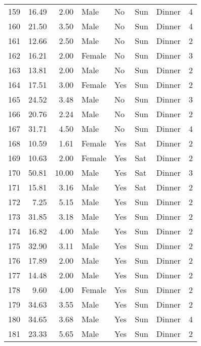 \begin{tabular}{lrrllllr}
159 &       16.49 &   2.00 &    Male &     No &   Sun &  Dinner &     4 \\
160 &       21.50 &   3.50 &    Male &     No &   Sun &  Dinner &     4 \\
161 &       12.66 &   2.50 &    Male &     No &   Sun &  Dinner &     2 \\
162 &       16.21 &   2.00 &  Female &     No &   Sun &  Dinner &     3 \\
163 &       13.81 &   2.00 &    Male &     No &   Sun &  Dinner &     2 \\
164 &       17.51 &   3.00 &  Female &    Yes &   Sun &  Dinner &     2 \\
165 &       24.52 &   3.48 &    Male &     No &   Sun &  Dinner &     3 \\
166 &       20.76 &   2.24 &    Male &     No &   Sun &  Dinner &     2 \\
167 &       31.71 &   4.50 &    Male &     No &   Sun &  Dinner &     4 \\
168 &       10.59 &   1.61 &  Female &    Yes &   Sat &  Dinner &     2 \\
169 &       10.63 &   2.00 &  Female &    Yes &   Sat &  Dinner &     2 \\
170 &       50.81 &  10.00 &    Male &    Yes &   Sat &  Dinner &     3 \\
171 &       15.81 &   3.16 &    Male &    Yes &   Sat &  Dinner &     2 \\
172 &        7.25 &   5.15 &    Male &    Yes &   Sun &  Dinner &     2 \\
173 &       31.85 &   3.18 &    Male &    Yes &   Sun &  Dinner &     2 \\
174 &       16.82 &   4.00 &    Male &    Yes &   Sun &  Dinner &     2 \\
175 &       32.90 &   3.11 &    Male &    Yes &   Sun &  Dinner &     2 \\
176 &       17.89 &   2.00 &    Male &    Yes &   Sun &  Dinner &     2 \\
177 &       14.48 &   2.00 &    Male &    Yes &   Sun &  Dinner &     2 \\
178 &        9.60 &   4.00 &  Female &    Yes &   Sun &  Dinner &     2 \\
179 &       34.63 &   3.55 &    Male &    Yes &   Sun &  Dinner &     2 \\
180 &       34.65 &   3.68 &    Male &    Yes &   Sun &  Dinner &     4 \\
181 &       23.33 &   5.65 &    Male &    Yes &   Sun &  Dinner &     2 \\

\end{tabular}
